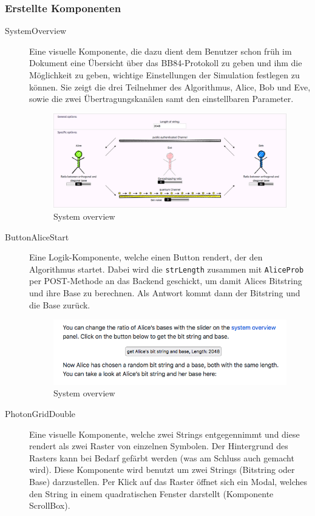 \documentclass[a4paper,10.2pt,pdftex]{scrartcl}%
\begin{document}
\subsubsection{Erstellte Komponenten} 
\begin{description}
\item[SystemOverview] Eine visuelle Komponente, die dazu dient dem Benutzer schon früh im Dokument eine Übersicht über das BB84-Protokoll zu geben und ihm die Möglichkeit zu geben, wichtige Einstellungen der Simulation festlegen zu können. Sie zeigt die drei Teilnehmer des Algorithmus, Alice, Bob und Eve, sowie die zwei Übertragungskanälen samt den einstellbaren Parameter.
\begin{figure}[h]
	\centering
  \includegraphics[width=\textwidth]{graphics/component_system_overview.png}
	\caption{System overview}
\end{figure}
\item[ButtonAliceStart] Eine Logik-Komponente, welche einen Button rendert, der den Algorithmus startet. Dabei wird die \texttt{strLength} zusammen mit \texttt{AliceProb} per POST-Methode an das Backend geschickt, um damit Alices Bitstring und ihre Base zu berechnen. Als Antwort kommt dann der Bitstring und die Base zurück.
\begin{figure}[h]
	\centering
  \includegraphics[width=\textwidth]{graphics/component_button_alice_start.png}
	\caption{System overview}
\end{figure}
\item[PhotonGridDouble] Eine visuelle Komponente, welche zwei Strings entgegennimmt und diese rendert als zwei Raster von einzelnen Symbolen. Der Hintergrund des Rasters kann bei Bedarf gefärbt werden (was am Schluss auch gemacht wird). Diese Komponente wird benutzt um zwei Strings (Bitstring oder Base) darzustellen. Per Klick auf das Raster öffnet sich ein Modal, welches den String in einem quadratischen Fenster darstellt (Komponente ScrollBox). 

\end{description}
\end{document}
